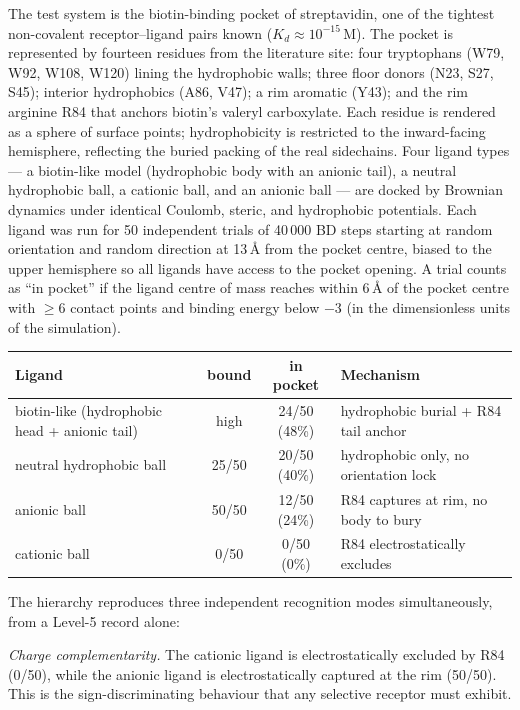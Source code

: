 \documentclass[11pt]{article}
\begin{document}
The test system is the biotin-binding pocket of streptavidin, one of the tightest non-covalent receptor--ligand pairs known ($K_d \approx 10^{-15}$\,M). The pocket is represented by fourteen residues from the literature site: four tryptophans (W79, W92, W108, W120) lining the hydrophobic walls; three floor donors (N23, S27, S45); interior hydrophobics (A86, V47); a rim aromatic (Y43); and the rim arginine R84 that anchors biotin's valeryl carboxylate. Each residue is rendered as a sphere of surface points; hydrophobicity is restricted to the inward-facing hemisphere, reflecting the buried packing of the real sidechains. Four ligand types --- a biotin-like model (hydrophobic body with an anionic tail), a neutral hydrophobic ball, a cationic ball, and an anionic ball --- are docked by Brownian dynamics under identical Coulomb, steric, and hydrophobic potentials. Each ligand was run for 50 independent trials of 40\,000 BD steps starting at random orientation and random direction at 13\,\AA{} from the pocket centre, biased to the upper hemisphere so all ligands have access to the pocket opening. A trial counts as ``in pocket'' if the ligand centre of mass reaches within 6\,\AA{} of the pocket centre with $\ge 6$ contact points and binding energy below $-3$ (in the dimensionless units of the simulation).

\begin{center}
\small
\begin{tabular}{@{}p{4.3cm}cc p{5.5cm}@{}}
\hline
\textbf{Ligand} & \textbf{bound} & \textbf{in pocket} & \textbf{Mechanism} \\
\hline
biotin-like (hydrophobic head + anionic tail) & high  & 24/50 (48\%) & hydrophobic burial + R84 tail anchor \\
neutral hydrophobic ball                      & 25/50 & 20/50 (40\%) & hydrophobic only, no orientation lock \\
anionic ball                                  & 50/50 & 12/50 (24\%) & R84 captures at rim, no body to bury \\
cationic ball                                 & 0/50  &  0/50 (0\%)  & R84 electrostatically excludes \\
\hline
\end{tabular}
\end{center}

The hierarchy reproduces three independent recognition modes simultaneously, from a Level-5 record alone:

\emph{Charge complementarity.} The cationic ligand is electrostatically excluded by R84 (0/50), while the anionic ligand is electrostatically captured at the rim (50/50). This is the sign-discriminating behaviour that any selective receptor must exhibit.
\end{document}
